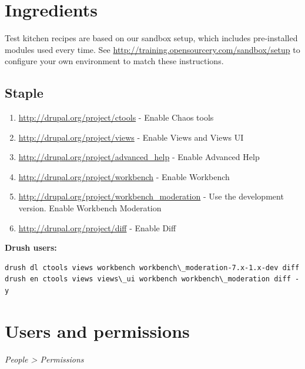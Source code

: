 \documentclass[letterpaper,10pt,english]{sphinxmanual}
\begin{document}
\chapter{Ingredients}
\label{moderation:welcome-to-test-kitchen-documentation}\label{moderation::doc}\label{moderation:ingredients}
Test kitchen recipes are based on our sandbox setup, which includes pre-installed modules used every time. See \href{http://training.opensourcery.com/sandbox/setup}{http://training.opensourcery.com/sandbox/setup} to configure your own environment to match these instructions.


\section{Staple}
\label{moderation:staple}\begin{enumerate}
\item {} 
\href{http://drupal.org/project/ctools}{http://drupal.org/project/ctools} - Enable Chaos tools

\item {} 
\href{http://drupal.org/project/views}{http://drupal.org/project/views} - Enable Views and Views UI

\item {} 
\href{http://drupal.org/project/advanced\_help}{http://drupal.org/project/advanced\_help} - Enable Advanced Help

\item {} 
\href{http://drupal.org/project/workbench}{http://drupal.org/project/workbench} - Enable Workbench

\item {} 
\href{http://drupal.org/project/workbench\_moderation}{http://drupal.org/project/workbench\_moderation} - Use the development version. Enable Workbench Moderation

\item {} 
\href{http://drupal.org/project/diff}{http://drupal.org/project/diff} - Enable Diff

\end{enumerate}

\textbf{Drush users:}

\begin{Verbatim}[commandchars=\\\{\}]
drush dl ctools views workbench workbench\_moderation-7.x-1.x-dev diff
drush en ctools views views\_ui workbench workbench\_moderation diff -y
\end{Verbatim}


\chapter{Users and permissions}
\label{moderation:users-and-permissions}
\emph{People \textgreater{} Permissions}
\end{document}
